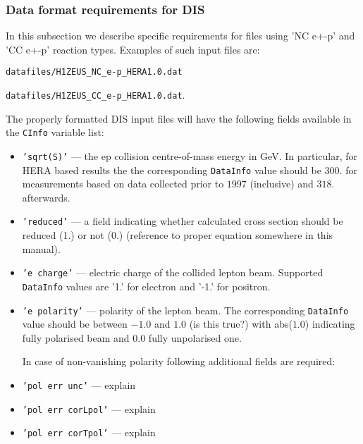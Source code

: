 \subsubsection{Data format requirements for DIS}

In this subsection we describe specific requirements for files using 'NC e+-p' and 'CC e+-p'
reaction types. Examples of such input files are:

{\tt datafiles/H1ZEUS\_NC\_e-p\_HERA1.0.dat}

{\tt datafiles/H1ZEUS\_CC\_e-p\_HERA1.0.dat}.

The properly formatted DIS input files will have the following fields available
in the {\tt CInfo} variable list: 

\begin{itemize} 
    \item  {\tt 'sqrt(S)'} --- the ep collision centre-of-mass energy in GeV. In particular, for 
    HERA based results the the corresponding {\tt DataInfo} value should be $300.$ for measurements
    based on data collected prior to $1997$ (inclusive) and $318.$ afterwards.
    
    \item {\tt 'reduced'} --- a field indicating whether calculated cross section should be reduced (1.) or not (0.)
    (reference to proper equation somewhere in this manual).
    
    \item {\tt 'e charge'} --- electric charge of the collided lepton beam. Supported {\tt DataInfo} values
    are '1.' for electron and '-1.' for positron.

    \item {\tt 'e polarity'} --- polarity of the lepton beam. The corresponding {\tt DataInfo} value 
    should be between $-1.0$ and $1.0$ (is this true?) with abs($1.0$) indicating fully polarised
    beam and $0.0$ fully unpolarised one. 

    In case of non-vanishing polarity following additional fields are required:

    \item {\tt 'pol err unc'} --- explain

    \item {\tt 'pol err corLpol'} --- explain
 
    \item {\tt 'pol err corTpol'} --- explain

\end{itemize}

